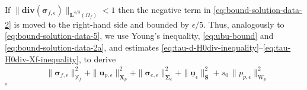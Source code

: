 \documentclass[11pt]{article}
\numberwithin{equation}{section}
\newcommand{\bsi}{{\boldsymbol\sigma}}
\newcommand{\bSigma}{{\boldsymbol\Sigma}}
\newcommand{\ubu}{\underline{\bu}}
\newcommand{\f}{\mathbf{f}}
\newcommand{\bu}{\mathbf{u}}
\newcommand{\0}{{\mathbf{0}}}
\def\bX{\mathbf{X}}
\def\bS{\mathbf{S}}
\newcommand{\bL}{\mathbf{L}}
\newcommand\bbX{\mathbb{X}}
\newcommand\bbL{\mathbb{L}}
\def\L{\mathrm{L}}
\def\W{\mathrm{W}}
\def\rd{\mathrm{d}}
\def\bdiv{\mathbf{div}}
\def\div{\mathrm{div}}
\def\wh{\widehat}
\newenvironment{proof}{\noindent{\it Proof.}}{\hfill$\square$}
\numberwithin{equation}{section}
\begin{document}
\begin{proof}
\medskip
{} If $\|\bdiv(\bsi_{f,\epsilon})\|_{\bL^{4/3}(\Omega_f)} < 1$ then the negative term in \eqref{eq:bound-solution-data-2} is moved to the right-hand side and bounded by $\epsilon/5$.
Thus, analogously to \eqref{eq:bound-solution-data-5}, we use Young's inequality, \eqref{eq:ubu-bound} and \eqref{eq:bound-solution-data-2a}, and estimates \eqref{eq:tau-d-H0div-inequality}--\eqref{eq:tau-H0div-Xf-inequality}, to derive
\begin{align}
&\|\bsi_{f,\epsilon}\|^2_{\bbX_f} 
+ \|\bu_{p,\epsilon}\|^2_{\bX_p}
+ \|\bsi_{e,\epsilon}\|^2_{\bSigma_e}
+ \|\ubu_\epsilon\|^2_\bS 
+ s_0\,\|p_{p,\epsilon}\|^2_{\W_p} 

\end{align}
\end{proof}
\end{document}
